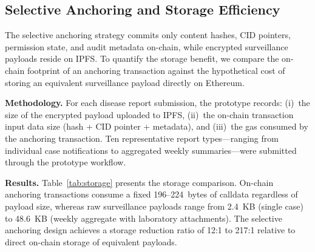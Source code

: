 \documentclass[AMA,LATO1COL]{WileyNJD-v2}
\begin{document}
%
%
%
%

\subsection{Selective Anchoring and Storage Efficiency}\label{subsec:anchoring_eval}

The selective anchoring strategy commits only content hashes, CID pointers, permission state, and audit metadata on-chain, while encrypted surveillance payloads reside on IPFS. To quantify the storage benefit, we compare the on-chain footprint of an anchoring transaction against the hypothetical cost of storing an equivalent surveillance payload directly on Ethereum.

\textbf{Methodology.} For each disease report submission, the prototype records: (i)~the size of the encrypted payload uploaded to IPFS, (ii)~the on-chain transaction input data size (hash + CID pointer + metadata), and (iii)~the gas consumed by the anchoring transaction. Ten representative report types---ranging from individual case notifications to aggregated weekly summaries---were submitted through the prototype workflow.

\textbf{Results.} Table~\ref{tab:storage} presents the storage comparison. On-chain anchoring transactions consume a fixed 196--224~bytes of calldata regardless of payload size, whereas raw surveillance payloads range from 2.4~KB (single case) to 48.6~KB (weekly aggregate with laboratory attachments). The selective anchoring design achieves a storage reduction ratio of 12:1 to 217:1 relative to direct on-chain storage of equivalent payloads.
\end{document}
